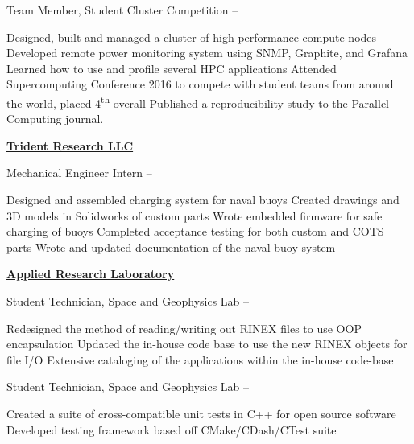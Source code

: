 \documentclass[letterpaper,MMMyyyy,nonstopmode]{simpleresumecv}
\begin{document}
\begin{Body}
\Gap
\BulletItem
Team Member, Student Cluster Competition
\hfill
{} --
\begin{Detail}
\SubBulletItem
Designed, built and managed a cluster of high performance compute nodes
\SubBulletItem
Developed remote power monitoring system using SNMP, Graphite, and Grafana
\SubBulletItem
Learned how to use and profile several HPC applications%
\SubBulletItem
Attended Supercomputing Conference 2016 to compete with student teams from around \newline 
the world, placed 4\textsuperscript{th} overall
\SubBulletItem
Published a reproducibility study to the Parallel Computing journal.
\end{Detail}

\BigGap

\Entry
\href{http://tridentresearch.com/}
{\textbf{Trident Research LLC}}

\Gap
\BulletItem
Mechanical Engineer Intern
\hfill
{} --
\begin{Detail}
\SubBulletItem
Designed and assembled charging system for naval buoys
\SubBulletItem
Created drawings and 3D models in Solidworks of custom parts
\SubBulletItem
Wrote embedded firmware for safe charging of buoys
\SubBulletItem
Completed acceptance testing for both custom and COTS parts
\SubBulletItem
Wrote and updated documentation of the naval buoy system
\end{Detail}

\BigGap

\Entry
\href{http://arlut.utexas.edu}
{\textbf{Applied Research Laboratory}}

\Gap
\BulletItem
Student Technician, Space and Geophysics Lab
\hfill
{} --
\begin{Detail}
\SubBulletItem
Redesigned the method of reading/writing out RINEX files to use OOP encapsulation
\SubBulletItem
Updated the in-house code base to use the new RINEX objects for file I/O
\SubBulletItem
Extensive cataloging of the applications within the in-house code-base
\end{Detail}

\Gap
\BulletItem
Student Technician, Space and Geophysics Lab
\hfill
{} --
\begin{Detail}
\SubBulletItem
Created a suite of cross-compatible unit tests in C++ for open source software
\SubBulletItem
Developed testing framework based off CMake/CDash/CTest suite
\end{Detail}


\end{Body}
\end{document}
